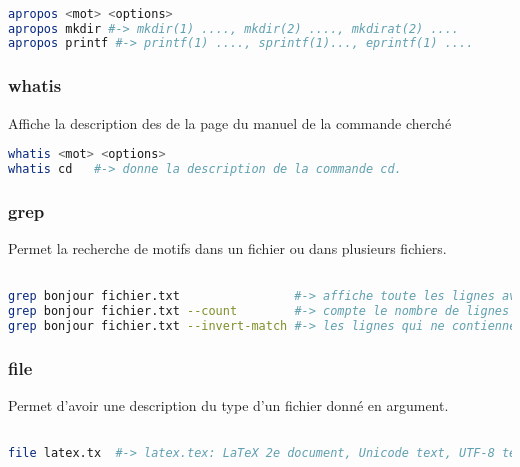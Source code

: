 \documentclass{article}
\begin{document}
\begin{lstlisting}[language=bash]

apropos <mot> <options>
apropos mkdir #-> mkdir(1) ...., mkdir(2) ...., mkdirat(2) ....
apropos printf #-> printf(1) ...., sprintf(1)..., eprintf(1) ....

\end{lstlisting}

\subsubsection{whatis}
Affiche la description des de la page du manuel de la commande cherché

\begin{lstlisting}[language=bash]
whatis <mot> <options>
whatis cd   #-> donne la description de la commande cd.
\end{lstlisting}

\subsubsection{grep}
Permet la recherche de motifs dans un fichier ou dans plusieurs fichiers.

\begin{lstlisting}[language=bash]

grep bonjour fichier.txt                #-> affiche toute les lignes avec le mot bonjour
grep bonjour fichier.txt --count        #-> compte le nombre de lignes avec le mot bonjour
grep bonjour fichier.txt --invert-match #-> les lignes qui ne contiennent pas le mot bonjour

\end{lstlisting}

\subsubsection{file}
Permet d'avoir une description du type d'un fichier donné en argument.


\begin{lstlisting}[language=bash]

file latex.tx  #-> latex.tex: LaTeX 2e document, Unicode text, UTF-8 text

\end{lstlisting}
\end{document}
